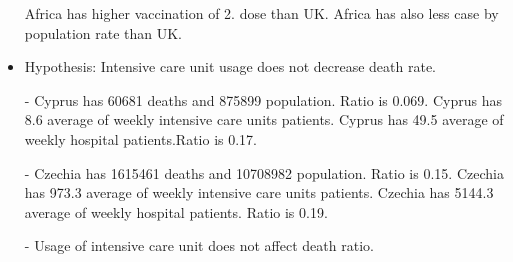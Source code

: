 \documentclass[a4 paper]{article}
\newcommand{\0}{\mathbf{0}}
\begin{document}
\begin{itemize}
	Africa has higher vaccination of 2. dose than UK. Africa has also less case by population rate  than UK.
	\item Hypothesis: Intensive care unit usage does not decrease death rate.
	\item[-] Cyprus has 60681 deaths and 875899 population. Ratio is 0.069.\newline
	Cyprus has 8.6 average of weekly intensive care units patients.
	Cyprus has 49.5 average of weekly hospital patients.Ratio is 0.17.\newline
	
	\item[-] Czechia has 1615461 deaths and 10708982 population. Ratio is 0.15.\newline
	Czechia has 973.3 average of weekly intensive care units patients.
	Czechia has 5144.3 average of weekly hospital patients. Ratio is 0.19.\newline
    \item[-]Usage of intensive care unit does not affect death ratio.
	
	
\end{itemize}
\end{document}
